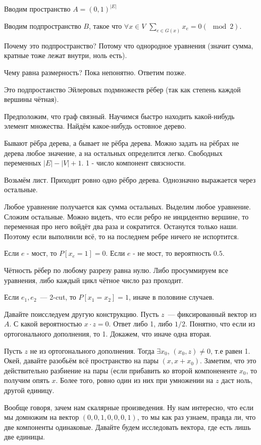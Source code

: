 \documentclass[10pt,a4paper]{article}
\author{Колесов Алексей}
\begin{document}
Вводим пространство $A = (0,1)^{|E|}$

Вводим подпространство $B$, такое что $\forall x \in V$ $\sum\limits_{e \in G(x)} x_e = 0 (\mod 2)$.

Почему это подпространство? Потому что однородное уравнения (значит сумма, кратные тоже лежат внутри, ноль есть).

Чему равна размерность? Пока непонятно. Ответим позже.

Это подпростанство Эйлеровых подмножеств рёбер (так как степень каждой вершины чётная).

Предположим, что граф связный. Научимся быстро находить какой-нибудь элемент множества. Найдём какое-нибудь остовное дерево.

Бывают рёбра дерева, а бывает не рёбра дерева. Можно задать на рёбрах не дерева любое значение, а на остальных определится легко. Свободных переменных $|E| - |V| + 1$. 1 - число компонент связсности.

Возьмём лист. Приходит ровно одно рёбро дерева. Однозначно выражается через остальные.

Любое уравнение получается как сумма остальных.
Выделим любое уравнение. Сложим остальные. Можно видеть, что если ребро не инцидентно вершине, то переменная про него войдёт два раза и сократится. Останутся только наши. Поэтому если выполнили всё, то на последнем ребре ничего не испортится.

Если $e$ - мост, то $P[x_e=1] = 0$. Если $e$ - не мост, то вероятность $0.5$.

Чётность рёбер по любому разрезу равна нулю. Либо просуммируем все уравнения, либо каждый цикл чётное число раз проходит.

Если $e_1,e_2$~--- 2-cut, то $P[x_1 = x_2] = 1$, иначе в половине случаев.

Давайте поисследуем другую конструкцию. Пусть $z$~--- фиксированный вектор из $A$. С какой вероятностью $x \cdot z = 0$. Ответ либо 1, либо $1/2$. Понятно, что если из ортогонального дополнения, то 1. Докажем, что иначе одна вторая.

Пусть $z$ не из ортогонального дополнения. Тогда $\exists x_0$, $(x_0, z) \neq 0$, т.е равен 1.
Окей, давайте разобьём всё пространство на пары $(x, x + x_0)$. Заметим, что это действительно разбиение на пары (если прибавить ко второй компонененте $x_0$, то получим опять $x$. Более того, ровно один из них при умножении на $z$ даст ноль, другой единицу.

Вообще говоря, зачем нам скалярные произведения. Ну нам интересно, что если мы домножим на вектор $(0,0,1,0,0,0,1)$, то мы как раз узнаем, правда ли, что две компоненты одинаковые. Давайте будем исследовать вектора, где есть лишь две единицы.
\end{document}
